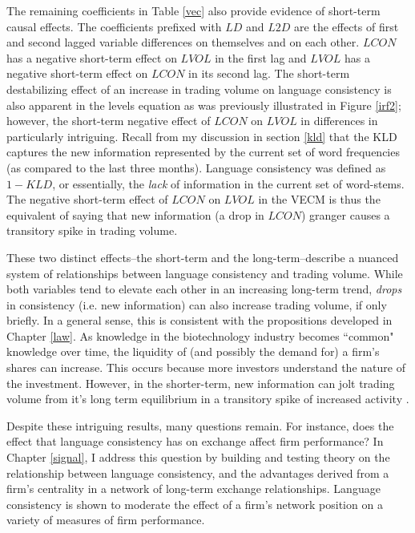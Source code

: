 The remaining coefficients in Table \ref{vec} also provide evidence of short-term causal effects. The coefficients prefixed with $LD$ and $L2D$ are the effects of first and second lagged variable differences on themselves and on each other. $LCON$ has a negative short-term effect on $LVOL$ in the first lag and $LVOL$ has a negative short-term effect on $LCON$ in its second lag. The short-term destabilizing effect of an increase in trading volume on language consistency is also apparent in the levels equation as was previously illustrated in Figure \ref{irf2}; however, the short-term negative effect of $LCON$ on $LVOL$ in differences in particularly intriguing. Recall from my discussion in section \ref{kld} that the KLD captures the new information represented by the current set of word frequencies (as compared to the last three months). Language consistency was defined as $1-KLD$, or essentially, the \emph{lack} of information in the current set of word-stems. The negative short-term effect of $LCON$ on $LVOL$ in the VECM is thus the equivalent of saying that new information (a drop in $LCON$) granger causes a transitory spike in trading volume.

These two distinct effects--the short-term and the long-term--describe a nuanced system of relationships between language consistency and trading volume. While both variables tend to elevate each other in an increasing long-term trend, \emph{drops} in consistency (i.e. new information) can also increase trading volume, if only briefly. In a general sense, this is consistent with the propositions developed in Chapter \ref{law}. As knowledge in the  biotechnology industry becomes ``common" knowledge over time, the liquidity of (and possibly the demand for) a firm's shares can increase. This occurs because more investors understand the nature of the investment. However, in the shorter-term, new information can jolt trading volume from it's long term equilibrium in a transitory spike of increased activity \citep{fama1969}.

Despite these intriguing results, many questions remain. For instance, does the effect that language consistency has on exchange affect firm performance? In Chapter \ref{signal}, I address this question by building and testing theory on the relationship between language consistency, and the advantages derived from a firm's centrality in a network of long-term exchange relationships. Language consistency is shown to moderate the effect of a firm's network position on a variety of measures of firm performance.


